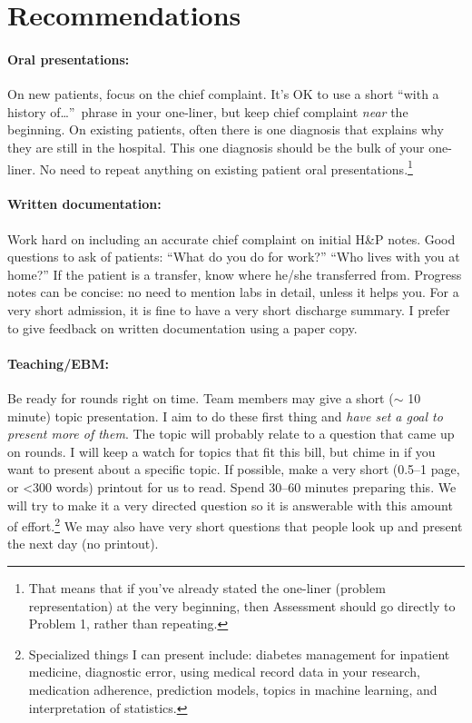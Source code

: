 \documentclass{tufte-handout}
\begin{document}
\section{Recommendations}

\paragraph{Oral presentations:} On new patients, focus on the chief
complaint. It's OK to use a short ``with a history
of\ldots{}''\ phrase in your one-liner, but keep chief complaint
\emph{near} the beginning. On existing patients, often there is one
diagnosis that explains why they are still in the hospital. This one
diagnosis should be the bulk of your one-liner. No need to repeat
anything on existing patient oral presentations.\footnote{That means
that if you've already stated the one-liner (problem representation)
at the very beginning, then Assessment should go directly to Problem 1, rather than repeating.}

\paragraph{Written documentation:} Work hard on including an accurate chief
complaint on initial H\&P notes. Good questions to ask of patients:
``What do you do for work?'' ``Who lives with you at home?'' If the
patient is a transfer, know where he/she transferred from. Progress
notes can be concise: no need to mention labs in detail, unless it
helps you. For a very short admission, it is fine to have a very short
discharge summary. I prefer to give feedback on written documentation
using a paper copy.

\paragraph{Teaching/EBM:} Be ready for rounds right on time.
Team members may give a short ($\sim$ 10 minute) topic presentation. I
aim to do these first thing and \emph{have set a goal to present more
of them}. The topic will probably
relate to a question that came up on rounds. I will keep a watch for
topics that fit this bill, but chime in if you want to present about a
specific topic. If possible, make a very short (0.5--1 page, or <300
words) printout for us to read. Spend 30--60 minutes preparing this.
We will try to make it a very directed question so it is answerable
with this amount of effort.\footnote{Specialized things I can present
include: diabetes management for inpatient medicine, diagnostic error,
using medical record data in your research, medication adherence,
prediction models, topics in machine learning, and interpretation of
statistics.} We may also have very short questions that people look up
and present the next day (no printout).
\end{document}
